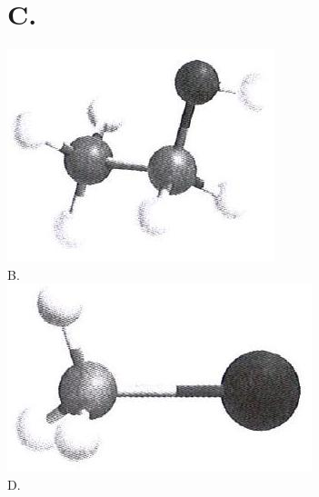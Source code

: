 \documentclass[10pt]{article}
\begin{document}
\section*{C.}
\includegraphics[max width=\textwidth, center]{2025_10_23_ae7aef68fb3b41082d29g-33(2)}\\
B.\\
\includegraphics[max width=\textwidth, center]{2025_10_23_ae7aef68fb3b41082d29g-33(3)}\\
D.\\
\end{document}
